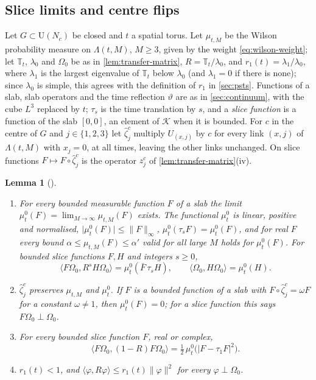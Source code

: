 \documentclass[11pt,a4paper]{amsart}
\newtheorem{lemma}[theorem]{Lemma}
\theoremstyle{definition}
\theoremstyle{remark}
\numberwithin{equation}{section}
\newcommand{\Kspace}{\mathcal{K}}    %
\newcommand{\ip}[2]{\langle #1,#2\rangle}  %
\newcommand{\norm}[1]{\lVert #1\rVert}     %
\newcommand{\abs}[1]{\lvert #1\rvert}      %
\newcommand{\U}{\mathrm{U}}                %
\newcommand{\TT}{\mathbb{T}}               %
\newcommand{\lzero}{\lambda_0}             %
\newcommand{\Omegazero}{\Omega_0}          %
\begin{document}
\subsection{Slice limits and centre flips}

Let $G\subset\U(N_c)$ be closed and $t$ a spatial torus. Let $\mu_{t,M}$ be the Wilson probability measure on $\Lambda(t,M)$, $M\ge3$, given by the weight \eqref{eq:wilson-weight}; let $\TT_t$, $\lzero$ and $\Omegazero$ be as in \cref{lem:transfer-matrix}, $R=\TT_t/\lzero$, and $r_1(t)=\lambda_1/\lzero$, where $\lambda_1$ is the largest eigenvalue of $\TT_t$ below $\lzero$ (and $\lambda_1=0$ if there is none); since $\lzero$ is simple, this agrees with the definition of $r_1$ in \cref{sec:psts}. Functions of a slab, slab operators and the time reflection $\vartheta$ are as in \cref{sec:continuum}, with the cube $L^3$ replaced by $t$; $\tau_s$ is the time translation by $s$, and a \emph{slice function} is a function of the slab $[0,0]$, an element of $\Kspace$ when it is bounded. For $c$ in the centre of $G$ and $j\in\{1,2,3\}$ let $\hat\zeta_j^c$ multiply $U_{(x,j)}$ by $c$ for every link $(x,j)$ of $\Lambda(t,M)$ with $x_j=0$, at all times, leaving the other links unchanged. On slice functions $F\mapsto F\circ\hat\zeta_j^c$ is the operator $z_j^c$ of \cref{lem:transfer-matrix}(iv).

\begin{lemma}[{\cite[Lemma~11(i), (iii)--(v) and Theorem~8, Steps~2, 4 and~5]{bhattacharjee2026first}}]\label{lem:fp-slice}
\leavevmode
\begin{enumerate}[label=(\alph*),leftmargin=2.2em]
\item For every bounded measurable function $F$ of a slab the limit $\mu^0_t(F)=\lim_{M\to\infty}\mu_{t,M}(F)$ exists. The functional $\mu^0_t$ is linear, positive and normalised, $\abs{\mu^0_t(F)}\le\norm{F}_\infty$, $\mu^0_t(\tau_sF)=\mu^0_t(F)$, and for real $F$ every bound $\alpha\le\mu_{t,M}(F)\le\alpha'$ valid for all large $M$ holds for $\mu^0_t(F)$. For bounded slice functions $F,H$ and integers $s\ge0$,
\begin{equation}\label{eq:fp-slice}
\ip{F\Omegazero}{R^sH\Omegazero}=\mu^0_t(\bar F\,\tau_sH),\qquad \ip{\Omegazero}{H\Omegazero}=\mu^0_t(H).
\end{equation}
\item $\hat\zeta_j^c$ preserves $\mu_{t,M}$ and $\mu^0_t$. If $F$ is a bounded function of a slab with $F\circ\hat\zeta_j^c=\omega F$ for a constant $\omega\ne1$, then $\mu^0_t(F)=0$; for a slice function this says $F\Omegazero\perp\Omegazero$.
\item For every bounded slice function $F$, real or complex,
\begin{equation}\label{eq:fp-dirichlet}
\ip{F\Omegazero}{(1-R)F\Omegazero}=\tfrac12\,\mu^0_t\bigl(\abs{F-\tau_1F}^2\bigr).
\end{equation}
\item $r_1(t)<1$, and $\ip{\varphi}{R\varphi}\le r_1(t)\norm{\varphi}^2$ for every $\varphi\perp\Omegazero$.
\end{enumerate}
\end{lemma}
\end{document}
